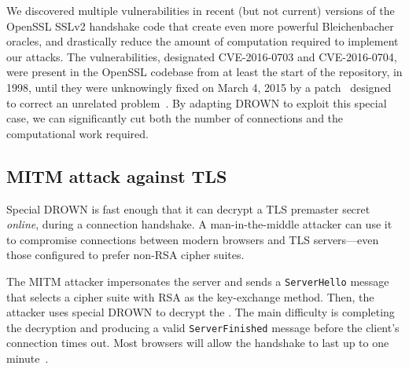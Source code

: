 \label{sec:special}

We discovered multiple vulnerabilities in recent
(but not current) versions of the OpenSSL SSLv2 handshake code that
create even more powerful Bleichenbacher oracles, and drastically reduce the amount
of computation required to implement our attacks.  
The vulnerabilities, designated CVE-2016-0703 and CVE-2016-0704, were
present in the OpenSSL codebase from at least the start of the repository,
in 1998, until they were unknowingly fixed on March 4, 2015 by a
patch~\cite{openssl-clear-patch} designed to correct an unrelated
problem~\cite{CVE-2015-0293}.
By adapting DROWN to exploit this special case, we can significantly cut both
the number of connections and the computational work required.






\subsection{MITM attack against TLS}
\label{sec:special_mitm_tls}

Special DROWN is fast enough that it can decrypt a TLS premaster
secret \emph{online}, during a connection handshake.  A
man-in-the-middle attacker can use it to compromise connections
between modern browsers and TLS servers---even those configured to
prefer non-RSA cipher suites.

The MITM attacker impersonates the server and sends a
\texttt{ServerHello} message that selects a cipher suite with RSA as
the key-exchange method.  Then, the attacker uses special DROWN to
decrypt the \pms.  The main difficulty is completing the decryption and producing a valid
\texttt{ServerFinished} message before the client's connection times
out.  Most browsers will allow the handshake to last up to one minute~\cite{logjam-2015}.

